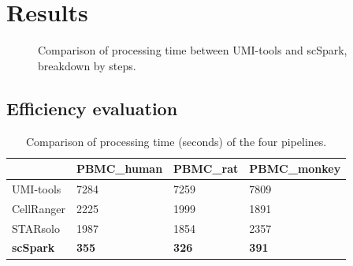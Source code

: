 \documentclass[conference]{IEEEtran}
\begin{document}
\section{Results}

\begin{figure}
	\centering
	\caption{Comparison of processing time between UMI-tools and scSpark, breakdown by steps.}
	\label{fig2}
\end{figure}

\subsection{Efficiency evaluation}

\begin{table}
	\centering
	\caption{Comparison of processing time (seconds) of the four pipelines.}\label{tab1}
	\begin{tabular}{l | l | l | l }
		\hline
		 & PBMC\_human & PBMC\_rat & PBMC\_monkey \\ 
		\hline
		UMI-tools & 7284 & 7259 & 7809 \\
		CellRanger & 2225 & 1999 & 1891 \\
		STARsolo & 1987 & 1854 & 2357 \\
		\textbf{scSpark} & \textbf{355} & \textbf{326} & \textbf{391} \\
		\hline
	\end{tabular}
\end{table}
\end{document}
